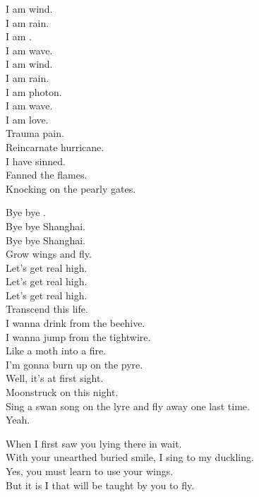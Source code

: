
I am wind. \\
I am rain. \\
I am . \\
I am wave. \\
I am wind. \\
I am rain. \\
I am photon. \\
I am wave. \\
I am love. \\
Trauma pain. \\
Reincarnate hurricane. \\
I have sinned. \\
Fanned the flames. \\
Knocking on the pearly gates. \\





Bye bye . \\
Bye bye Shanghai. \\
Bye bye Shanghai. \\
Grow wings and fly. \\
Let's get real high. \\
Let's get real high. \\
Let's get real high. \\
Transcend this life. \\

I wanna drink from the beehive. \\
I wanna jump from the tightwire. \\
Like a moth into a fire. \\
I'm gonna burn up on the pyre. \\
Well, it's  at first sight. \\
Moonstruck on this night. \\
Sing a swan song on the lyre and fly away one last time. \\
Yeah. \\


When I first saw you lying there in wait. \\
With your unearthed buried smile, I sing to my duckling. \\
Yes, you must learn to use your wings. \\
But it is I that will be taught by you to fly. \\

